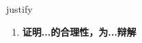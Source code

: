 
\begin{frame}
{\huge justify}
\begin{center}
\begin{enumerate}\Large
  \item \textbf{证明...的合理性，为...辩解}
\end{enumerate}
\end{center}
\end{frame}
